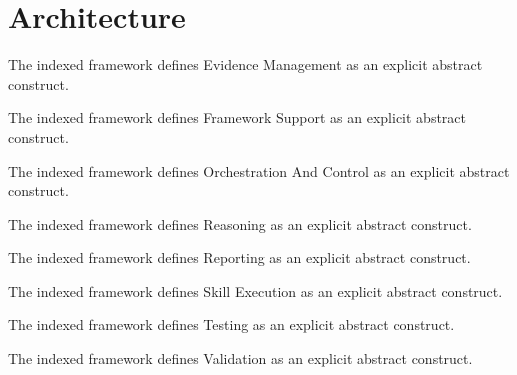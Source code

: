 \section{Architecture}

The indexed framework defines Evidence Management as an explicit abstract construct.

The indexed framework defines Framework Support as an explicit abstract construct.

The indexed framework defines Orchestration And Control as an explicit abstract construct.

The indexed framework defines Reasoning as an explicit abstract construct.

The indexed framework defines Reporting as an explicit abstract construct.

The indexed framework defines Skill Execution as an explicit abstract construct.

The indexed framework defines Testing as an explicit abstract construct.

The indexed framework defines Validation as an explicit abstract construct.
